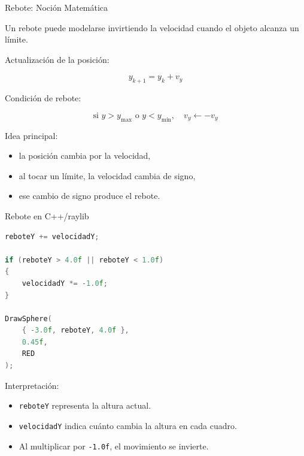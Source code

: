 \documentclass{beamer}
\begin{document}
\begin{frame}{Rebote: Noción Matemática}

Un rebote puede modelarse invirtiendo la velocidad cuando el objeto alcanza un límite.

\vspace{0.4cm}

Actualización de la posición:

$$
y_{k+1}=y_k+v_y
$$

\vspace{0.3cm}

Condición de rebote:

$$
\text{si } y>y_{\max} \text{ o } y<y_{\min},
\quad v_y \leftarrow -v_y
$$

\vspace{0.4cm}

Idea principal:

\begin{itemize}
    \item la posición cambia por la velocidad,
    \item al tocar un límite, la velocidad cambia de signo,
    \item ese cambio de signo produce el rebote.
\end{itemize}

\end{frame}

\begin{frame}[fragile]{Rebote en C++/raylib}

\begin{lstlisting}[language=C++,basicstyle=\ttfamily\scriptsize]
reboteY += velocidadY;

if (reboteY > 4.0f || reboteY < 1.0f)
{
    velocidadY *= -1.0f;
}

DrawSphere(
    { -3.0f, reboteY, 4.0f },
    0.45f,
    RED
);
\end{lstlisting}

\vspace{0.3cm}

Interpretación:

\begin{itemize}
    \item \texttt{reboteY} representa la altura actual.
    \item \texttt{velocidadY} indica cuánto cambia la altura en cada cuadro.
    \item Al multiplicar por \texttt{-1.0f}, el movimiento se invierte.
\end{itemize}

\end{frame}
\end{document}
